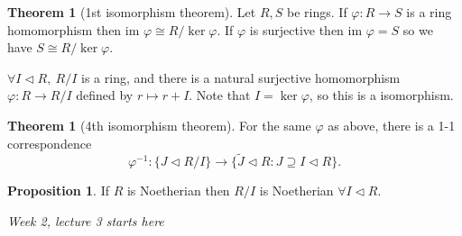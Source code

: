 \documentclass[a4paper]{article}
\newcommand{\im}{\text{im }}
\theoremstyle{definition}
\newtheorem{prop}[defn]{Proposition}
\newtheorem{thm}[defn]{Theorem}
\begin{document}
\begin{thm}[1st isomorphism theorem]
Let $R,S$ be rings. If $\varphi : R\rightarrow S$ is a ring homomorphism then $\im \varphi\cong R/\ker \varphi$. If $\varphi$ is surjective then $\im \varphi=S$ so we have $S\cong R/\ker \varphi$.

$\forall I\lhd R,\ R/I$ is a ring, and there is a natural surjective homomorphism $\varphi:R\rightarrow R/I$ defined by $r\mapsto r+I$. Note that $I=\ker\varphi$, so this is a isomorphism.
\end{thm}
\begin{thm}[4th isomorphism theorem]
For the same $\varphi$ as above, there is a 1-1 correspondence
\[
\varphi^{-1}:\{J\lhd R/I\} \rightarrow \{\tilde J \lhd R: J\supseteq I\lhd R\}.
\]
\end{thm}
\begin{prop}
If $R$ is Noetherian then $R/I$ is Noetherian $\forall I\lhd R$.
\end{prop}

\begin{flushright}
\textit{Week 2, lecture 3 starts here}
\end{flushright}
\end{document}
